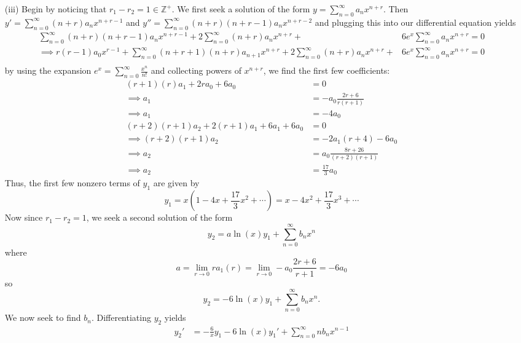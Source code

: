 \documentclass{article}
\begin{document}
\begin{itemize}
\begin{itemize}
\begin{itemize}
            \item[(iii)] Begin by noticing that $r_1 - r_2 = 1 \in \mathbb{Z}^+$. We first seek a solution of the form $y = \sum_{n = 0}^{\infty} a_nx^{n + r}$. Then $y' = \sum_{n = 0}^{\infty} (n + r)a_n x^{n + r - 1}$ and $y'' = \sum_{n = 0}^{\infty} (n + r)(n + r - 1)a_nx^{n + r - 2}$ and plugging this into our differential equation yields
            \begin{align*}
                \sum_{n = 0}^{\infty} (n + r)(n + r - 1)a_nx^{n + r - 1} + 2\sum_{n = 0}^{\infty} (n + r)a_nx^{n+ r} + &6e^x\sum_{n = 0}^{\infty}a_nx^{n + r} = 0\\
                \implies r(r - 1)a_0 x^{r - 1} + \sum_{n = 0}^{\infty}(n + r + 1)(n + r)a_{n + 1}x^{n + r} + 2\sum_{n = 0}^{\infty} (n + r)a_n x^{n + r} + &6e^x\sum_{n = 0}^{\infty} a_n x^{n + r} = 0\\
            \end{align*}
            by using the expansion $e^x = \sum_{n = 0}^{\infty} \frac{x^n}{n!}$ and collecting powers of $x^{n + r}$, we find the first few coefficients:
            \begin{align*}
                (r + 1)(r)a_1 + 2r a_0 + 6a_0 &= 0\\
                \implies a_1 &= -a_0\frac{2r + 6}{r(r + 1)}\\
                \implies a_1 &= -4a_0 \tag{$r = 1$}\\
                (r+2)(r+1)a_2 + 2(r+1)a_1 + 6a_1 + 6a_0 &= 0\\
                \implies (r+2)(r+1)a_2 &= -2a_1(r + 4) - 6a_0\\
                \implies a_2 &= a_0 \frac{8r + 26}{(r + 2)(r + 1)}\\
                \implies a_2 &= \frac{17}{3}a_0 \tag{$r = 1$}
            \end{align*}
            Thus, the first few nonzero terms of $y_1$ are given by
            \[y_1 = x\left(1 - 4x + \frac{17}{3}x^2 + \cdots\right) = x - 4x^2 + \frac{17}{3}x^3 + \cdots\]
            Now since $r_1 - r_2 = 1$, we seek a second solution of the form
            \[y_2 = a\ln(x)y_1 + \sum_{n = 0}^{\infty}b_n x^n\]
            where 
            \[a = \lim_{r \to 0} ra_1(r) = \lim_{r \to 0} -a_0\frac{2r + 6}{r+1} = -6a_0\]
            so 
            \[y_2 = -6\ln(x)y_1 + \sum_{n = 0}^{\infty} b_n x^n.\]
            We now seek to find $b_n$. Differentiating $y_2$ yields
            \begin{align*}
                y_2' &= -\frac{6}{x}y_1 - 6\ln(x)y_1' + \sum_{n = 0}^{\infty}nb_nx^{n -1}\\

\end{align*}
\end{itemize}
\end{itemize}
\end{itemize}
\end{document}
